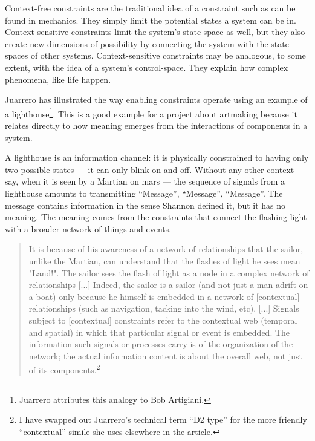 \documentclass[letterpaper]{article}
\begin{document}
    Context-free constraints are the traditional idea of a constraint such as can be found in mechanics. They simply limit the potential states a system can be in. Context-sensitive constraints limit the system's state space as well, but they also create new dimensions of possibility by connecting the system with the state-spaces of other systems. Context-sensitive constraints may be analogous, to some extent, with the idea of a system's control-space. They explain how complex phenomena, like life happen. 
    
    Juarrero has illustrated the way enabling constraints operate using an example of a lighthouse\footnote{

        Juarrero attributes this analogy to Bob Artigiani.

    }. This is a good example for a project about artmaking because it relates directly to how meaning emerges from the interactions of components in a system.

    A lighthouse is an information channel: it is physically constrained to having only two possible states — it can only blink on and off. Without any other context — say, when it is seen by a Martian on mars — the sequence of signals from a lighthouse amounts to transmitting “Message”, “Message”, “Message”. The message contains information in the sense Shannon defined it, but it has no meaning. The meaning comes from the constraints that connect the flashing light with a broader network of things and events.

    \begin{quote}
        It is because of his awareness of a network of relationships that the sailor, unlike the Martian, can understand that the flashes of light he sees mean "Land!". The sailor sees the flash of light as a node in a complex network of relationships [...] Indeed, the sailor is a sailor (and not just a man adrift on a boat) only because he himself is embedded in a network of [contextual] relationships (such as navigation, tacking into the wind, etc). [...] Signals subject to [contextual] constraints refer to the contextual web (temporal and spatial) in which that particular signal or event is embedded. The information such signals or processes carry is of the organization of the network; the actual information content is about the overall web, not just of its components.\footnote{

            I have swapped out Juarrero's technical term “D2 type” for the more friendly “contextual” simile she uses elsewhere in the article.

        } \citep[p.237]{JuarreroCsltyAsCnstrnt1998}
    \end{quote}
    
\end{document}
